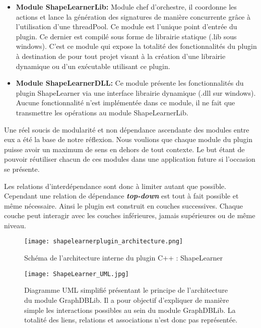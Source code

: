 \begin{itemize}
	 \item \textbf{Module ShapeLearnerLib: } Module chef d'orchestre, il coordonne les actions et lance la génération des signatures de manière concurrente grâce à l'utilisation d'une threadPool. Ce module est l'unique point d'entrée du plugin. Ce dernier est compilé sous forme de librairie statique (.lib sous windows). C'est ce module qui expose la totalité des fonctionnalités du plugin à destination de pour tout projet visant à la création d'une librairie dynamique ou d'un exécutable utilisant ce plugin.\\
	 
	 \item \textbf{Module ShapeLearnerDLL: } Ce module présente les fonctionnalités du plugin ShapeLearner\- via une interface librairie dynamique (.dll sur windows). Aucune fonctionnalité n'est implémentée dans ce module, il ne fait que transmettre les opérations au module ShapeLearnerLib.\\
\end{itemize} 

\clearpage

Une réel soucis de modularité et non dépendance ascendante des modules entre eux a été la base de notre réflexion. Nous voulions que chaque module du plugin puisse avoir un maximum de sens en dehors de tout contexte. Le but étant de pouvoir réutiliser chacun de ces modules dans une application future si l'occasion se présente. 

Les relations d'interdépendance sont donc à limiter autant que possible. Cependant une relation de dépendance \textbf{\textit{top-down}} est tout à fait possible et même nécessaire. Ainsi le plugin est construit en couches successives. Chaque couche peut interagir avec les couches inférieures, jamais supérieures ou de même niveau.
\vspace{-1cm}

 \begin{figure}[H]
    \centering
    \texttt{[image: shapelearnerplugin\_architecture.png]}
	\caption{Schéma de l'architecture interne du plugin C++ : ShapeLearner}\label{image.archiShapeLearner} 
\end{figure}

\clearpage

 \begin{figure}[H]
    \centering
    \texttt{[image: ShapeLearner\_UML.jpg]}
	\caption{Diagramme UML simplifié présentant le principe de l'architecture du module GraphDBLib\-. Il a pour objectif d'expliquer de manière simple les interactions possibles au sein du module GraphDBLib. La totalité des liens, relations et associations n'est donc pas représentée.}\label{image.UMLGraphDBLib} 
\end{figure}

